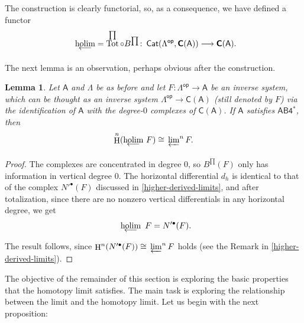 \documentclass[reqno,11pt]{amsart}
\theoremstyle{plain}
\newtheorem{lem}[thm]{Lemma}
\theoremstyle{remark}
\theoremstyle{definition}
\numberwithin{equation}{thm}
\newcommand{\SA}{\mathsf{A}}
\newcommand{\CCC}{\boldsymbol{\mathsf{C}}}
\newcommand{\holim}[1]{\begin{array}[t]{c} {\rm holim}\\[-7.5 pt]
		{\longleftarrow} \end{array}}
\newcommand{\hocolim}[1]{\begin{array}[t]{c} {\rm holim}\\[-7.5 pt]
		{\longrightarrow} \end{array}}
\newcommand{\lto}{\longrightarrow}
\DeclareMathOperator{\Tot}{Tot}
\DeclareMathOperator{\h}{H}
\newcommand{\op}{\mathsf{op}}
\DeclareMathOperator{\cat}{\mathsf{Cat}}
\begin{document}
	\noindent
	The construction is clearly functorial, so, as a consequence, we have defined a functor
	\[\holim{} \!\!\! = \Tot^{\prod} \circ B^{\prod} \colon \cat(\Lambda^\op, \CCC(\SA)) \lto \CCC(\SA).\]
	
	The next lemma is an observation, perhaps obvious after the construction.
	
	\begin{lem}\label{complexes-concentrated-degree-0}
		Let $\SA$ and $\Lambda$ be as before and let $F \colon \Lambda^\op \to \SA$ be an inverse system, which can be thought as an inverse system $\Lambda^\op \to \CCC(\SA)$ (still denoted by $F$) via the identification of $\SA$ with the degree-$0$ complexes of $\CCC(\SA)$. If $\SA$ satisfies $\mathsf{AB4^*}$, then
		\[ \h^n(\!\!\!\holim{} \! F) \cong \sideset{}{^{n}}\varprojlim F.\]
	\end{lem}
	\begin{proof}
		The complexes are concentrated in degree $0$, so $B^{\prod}(F)$ only has information in vertical degree $0$. The horizontal differential $d_h$ is identical to that of the complex $N'^\bullet(F)$ discussed in \ref{higher-derived-limits}, and after totalization, since there are no nonzero vertical differentials in any horizontal degree, we get
		\[\holim{}F = N'^\bullet(F).\]
		The result follows, since $\h^n(N'^\bullet(F)) \cong \sideset{}{^{n}}\varprojlim F$ holds (see the Remark in \ref{higher-derived-limits}).
	\end{proof}
	
	The objective of the remainder of this section is exploring the basic properties that the homotopy limit satisfies. %
	The main task is exploring the relationship between the limit and the homotopy limit. Let us begin with the next proposition:
	
	
\end{document}
